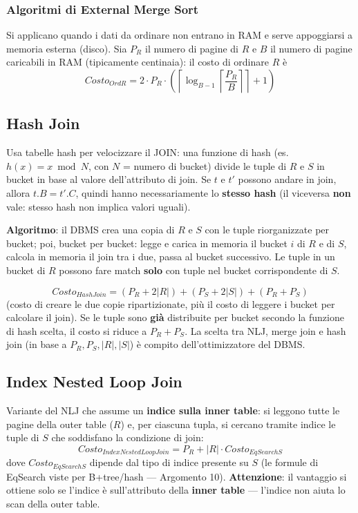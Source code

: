 \documentclass[12pt, a4paper]{article}
\begin{document}
\subsubsection{Algoritmi di External Merge Sort}
Si applicano quando i dati da ordinare non entrano in RAM e serve appoggiarsi a memoria esterna (disco). Sia $P_R$ il numero di pagine di $R$ e $B$ il numero di pagine caricabili in RAM (tipicamente centinaia): il costo di ordinare $R$ è
$$Costo_{OrdR} = 2 \cdot P_R \cdot \left( \left\lceil \log_{B-1}\left\lceil \frac{P_R}{B} \right\rceil \right\rceil + 1 \right)$$

\subsection{Hash Join}
Usa tabelle hash per velocizzare il JOIN: una funzione di hash (es. $h(x)=x \bmod N$, con $N$ = numero di bucket) divide le tuple di $R$ e $S$ in bucket in base al valore dell'attributo di join. Se $t$ e $t'$ possono andare in join, allora $t.B=t'.C$, quindi hanno necessariamente lo \textbf{stesso hash} (il viceversa \textbf{non} vale: stesso hash non implica valori uguali).

\textbf{Algoritmo}: il DBMS crea una copia di $R$ e $S$ con le tuple riorganizzate per bucket; poi, bucket per bucket: legge e carica in memoria il bucket $i$ di $R$ e di $S$, calcola in memoria il join tra i due, passa al bucket successivo. Le tuple in un bucket di $R$ possono fare match \textbf{solo} con tuple nel bucket corrispondente di $S$.

$$Costo_{HashJoin} = (P_R + 2|R|) + (P_S + 2|S|) + (P_R + P_S)$$
(costo di creare le due copie ripartizionate, più il costo di leggere i bucket per calcolare il join). Se le tuple sono \textbf{già} distribuite per bucket secondo la funzione di hash scelta, il costo si riduce a $P_R+P_S$. La scelta tra NLJ, merge join e hash join (in base a $P_R,P_S,|R|,|S|$) è compito dell'ottimizzatore del DBMS.

\subsection{Index Nested Loop Join}
Variante del NLJ che assume un \textbf{indice sulla inner table}: si leggono tutte le pagine della outer table ($R$) e, per ciascuna tupla, si cercano tramite indice le tuple di $S$ che soddisfano la condizione di join:
$$Costo_{IndexNestedLoopJoin} = P_R + |R| \cdot Costo_{EqSearchS}$$
dove $Costo_{EqSearchS}$ dipende dal tipo di indice presente su $S$ (le formule di EqSearch viste per B+tree/hash — Argomento 10). \textbf{Attenzione}: il vantaggio si ottiene solo se l'indice è sull'attributo della \textbf{inner table} — l'indice non aiuta lo scan della outer table.
\end{document}
